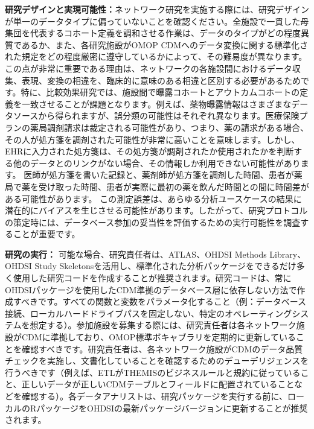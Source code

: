 \documentclass[
  11pt]{book}
\theoremstyle{definition}
\theoremstyle{definition}
\theoremstyle{definition}
\theoremstyle{definition}
\theoremstyle{remark}
\begin{document}
\textbf{研究デザインと実現可能性：}ネットワーク研究を実施する際には、研究デザインが単一のデータタイプに偏っていないことを確認ください。全施設で一貫した母集団を代表するコホート定義を調和させる作業は、データのタイプがどの程度異質であるか、また、各研究施設がOMOP CDMへのデータ変換に関する標準化された規定をどの程度厳密に遵守しているかによって、その難易度が異なります。この点が非常に重要である理由は、ネットワークの各施設間におけるデータ収集、表現、変換の相違を、臨床的に意味のある相違と区別する必要があるためです。特に、比較効果研究では、施設間で曝露コホートとアウトカムコホートの定義を一致させることが課題となります。例えば、薬物曝露情報はさまざまなデータソースから得られますが、誤分類の可能性はそれぞれ異なります。医療保険プランの薬局調剤請求は裁定される可能性があり、つまり、薬の請求がある場合、その人が処方箋を調剤された可能性が非常に高いことを意味します。しかし、EHRに入力された処方箋は、その処方箋が調剤されたか使用されたかを判断する他のデータとのリンクがない場合、その情報しか利用できない可能性があります。 医師が処方箋を書いた記録と、薬剤師が処方箋を調剤した時間、患者が薬局で薬を受け取った時間、患者が実際に最初の薬を飲んだ時間との間に時間差がある可能性があります。 この測定誤差は、あらゆる分析ユースケースの結果に潜在的にバイアスを生じさせる可能性があります。したがって、研究プロトコルの策定時には、データベース参加の妥当性を評価するための実行可能性を調査することが重要です。

\textbf{研究の実行：} 可能な場合、研究責任者は、ATLAS、OHDSI Methods Library、OHDSI Study Skeletonsを活用し、標準化された分析パッケージをできるだけ多く使用した研究コードを作成することが推奨されます。研究コードは、常にOHDSIパッケージを使用したCDM準拠のデータベース層に依存しない方法で作成すべきです。すべての関数と変数をパラメータ化すること（例：データベース接続、ローカルハードドライブパスを固定しない、特定のオペレーティングシステムを想定する）。参加施設を募集する際には、研究責任者は各ネットワーク施設がCDMに準拠しており、OMOP標準ボキャブラリを定期的に更新していることを確認すべきです。研究責任者は、各ネットワーク施設がCDMのデータ品質チェックを実施し、文書化していることを確認するためのデューデリジェンスを行うべきです（例えば、ETLがTHEMISのビジネスルールと規約に従っていること、正しいデータが正しいCDMテーブルとフィールドに配置されていることなどを確認する）。各データアナリストは、研究パッケージを実行する前に、ローカルのRパッケージをOHDSIの最新パッケージバージョンに更新することが推奨されます。
\end{document}
